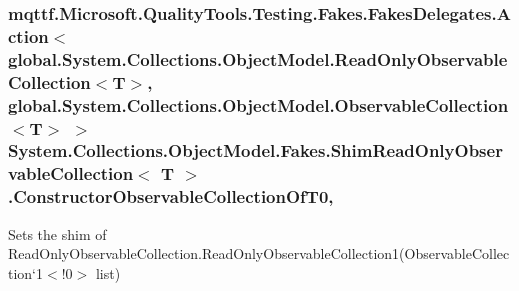 \hypertarget{class_system_1_1_collections_1_1_object_model_1_1_fakes_1_1_shim_read_only_observable_collection_3_01_t_01_4_a5f35c11e7d7b34b4cea1a44da9f3163a}{
\subsubsection[{Constructor\-Observable\-Collection\-Of\-T0}]{\setlength{\rightskip}{0pt plus 5cm}mqttf.\-Microsoft.\-Quality\-Tools.\-Testing.\-Fakes.\-Fakes\-Delegates.\-Action$<$global.\-System.\-Collections.\-Object\-Model.\-Read\-Only\-Observable\-Collection$<$T$>$, global.\-System.\-Collections.\-Object\-Model.\-Observable\-Collection$<$T$>$ $>$ System.\-Collections.\-Object\-Model.\-Fakes.\-Shim\-Read\-Only\-Observable\-Collection$<$ T $>$.Constructor\-Observable\-Collection\-Of\-T0\hspace{0.3cm}{\ttfamily [static]}, {\ttfamily [set]}}}\label{class_system_1_1_collections_1_1_object_model_1_1_fakes_1_1_shim_read_only_observable_collection_3_01_t_01_4_a5f35c11e7d7b34b4cea1a44da9f3163a}


Sets the shim of Read\-Only\-Observable\-Collection{.\-Read\-Only\-Observable\-Collection}1(Observable\-Collection`1$<$!0$>$ list)

